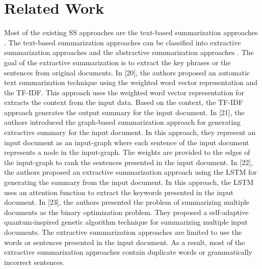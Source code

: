 \documentclass[preprint,review,12pt]{elsarticle}
\begin{document}
\section{Related Work}\label{sec:Survey}
		\begin{comment}
		As discussed in Section~\ref{sec:Info}, we categorize the existing summarization techniques into SS techniques and the MS techniques. In Section~\ref{ss}, we discuss the existing SS techniques such as the text-based summarization and the image-based summarization. Similarly, in Section~\ref{ms}, we present the existing MS techniques.  
		In this Section, we present the literature work on the SS approaches and the MS approaches. 
		\subsection{Single-modal summarization}\label{ss}
		\end{comment}
 Most of the existing SS approaches are the text-based summarization approaches \cite{20,21,22,23,24,25,26}. The text-based summarization approaches can be classified into extractive summarization approaches \cite{20,21,22,23} and the abstractive summarization approaches \cite{24,25,26}. The goal of the extractive summarization is to extract the key phrases or the sentences from original documents. In [20], the authors proposed an automatic text summarization technique using the weighted word vector representation and the TF-IDF. This approach uses the weighted word vector representation for extracts the context from the input data. Based on the context, the TF-IDF approach generates the output summary for the input document. In [21], the authors introduced the graph-based summarization approach for generating extractive summary for the input document. In this approach, they represent an input document as an input-graph where each sentence of the input document represents a node in the input-graph. The weights are provided to the edges of the input-graph to rank the sentences presented in the input document. In [22], the authors proposed an extractive summarization approach using the LSTM for generating the summary from the input document. In this approach, the LSTM uses an attention function to extract the keywords presented in the input document. In [23], the authors presented the problem of summarizing multiple documents as the binary optimization problem. They proposed a self-adaptive quantum-inspired genetic algorithm technique for summarizing multiple input documents. The extractive summarization approaches are limited to use the words or sentences presented in the input document. As a result, most of the extractive summarization approaches contain duplicate words or grammatically incorrect sentences. 
\end{document}
